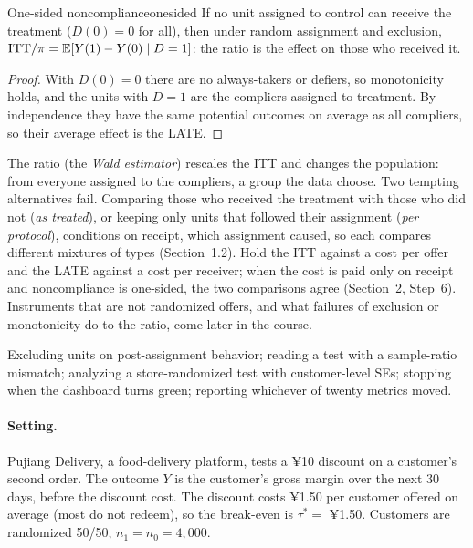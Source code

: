 \documentclass[11pt]{article}
\begin{document}
\begin{prop}{One-sided noncompliance}{onesided}
If no unit assigned to control can receive the treatment ($D(0) = 0$ for all), then under random assignment and
exclusion, $\text{ITT}/\pi = \mathbb{E}[Y(1) - Y(0) \mid D = 1]$: the ratio is the effect on those who received it.
\end{prop}
\begin{proof}
With $D(0) = 0$ there are no always-takers or defiers, so monotonicity holds, and the units with $D = 1$ are the
compliers assigned to treatment. By independence they have the same potential outcomes on average as all
compliers, so their average effect is the LATE.
\end{proof}

The ratio (the \emph{Wald estimator}) rescales the ITT and changes the population: from everyone assigned to the
compliers, a group the data choose. Two tempting alternatives fail. Comparing those who received the treatment
with those who did not (\emph{as treated}), or keeping only units that followed their assignment
(\emph{per protocol}), conditions on receipt, which assignment caused, so each compares different mixtures of
types (Section~1.2). Hold the ITT against a cost per offer and the LATE against a cost per receiver; when the
cost is paid only on receipt and noncompliance is one-sided, the two comparisons agree (Section~2, Step~6).
Instruments that are not randomized offers, and what failures of exclusion or monotonicity do to the ratio, come
later in the course.

\begin{pitfall}
Excluding units on post-assignment behavior; reading a test with a sample-ratio mismatch; analyzing a
store-randomized test with customer-level SEs; stopping when the dashboard turns green; reporting whichever
of twenty metrics moved.
\end{pitfall}


\sectiontwo

\paragraph{Setting.} Pujiang Delivery, a food-delivery platform, tests a ¥10 discount on a customer's second order.
The outcome $Y$ is the customer's gross margin over the next 30 days, before the discount cost. The discount
costs ¥1.50 per customer offered on average (most do not redeem), so the break-even is $\tau^\ast = $ ¥1.50.
Customers are randomized 50/50, $n_1 = n_0 = 4{,}000$.
\end{document}
